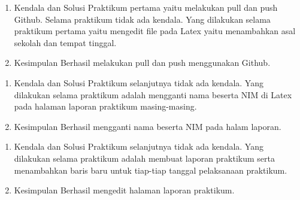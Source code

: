 
\begin{enumerate}
\item Kendala dan Solusi
\newline Praktikum pertama yaitu melakukan pull dan push Github. Selama praktikum tidak ada kendala. Yang dilakukan selama praktikum pertama yaitu mengedit file pada Latex yaitu menambahkan asal sekolah dan tempat tinggal.


\item Kesimpulan
\newline Berhasil melakukan pull dan push menggunakan Github. 


\end{enumerate}

\begin{enumerate}
\item Kendala dan Solusi
\newline Praktikum selanjutnya tidak ada kendala. Yang dilakukan selama praktikum adalah mengganti nama beserta NIM di Latex pada halaman laporan praktikum masing-masing.

\item Kesimpulan
\newline Berhasil mengganti nama beserta NIM pada halam laporan.

\end{enumerate}


\begin{enumerate}
\item Kendala dan Solusi
\newline Praktikum selanjutnya tidak ada kendala. Yang dilakukan selama praktikum adalah membuat laporan praktikum serta menambahkan baris baru untuk tiap-tiap tanggal pelaksanaan praktikum.

\item Kesimpulan
\newline Berhasil mengedit halaman laporan praktikum.

\end{enumerate}

